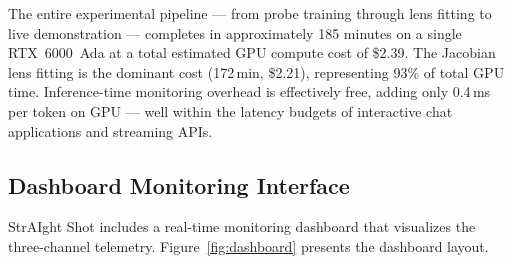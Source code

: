 \documentclass[11pt]{article}
\begin{document}
The entire experimental pipeline — from probe training through lens fitting to live demonstration — completes in approximately 185 minutes on a single RTX~6000~Ada at a total estimated GPU compute cost of \$2.39. The Jacobian lens fitting is the dominant cost (172\,min, \$2.21), representing 93\% of total GPU time. Inference-time monitoring overhead is effectively free, adding only 0.4\,ms per token on GPU — well within the latency budgets of interactive chat applications and streaming APIs.

\subsection{Dashboard Monitoring Interface}

StrAIght Shot includes a real-time monitoring dashboard that visualizes the three-channel telemetry. Figure~\ref{fig:dashboard} presents the dashboard layout.
\end{document}

